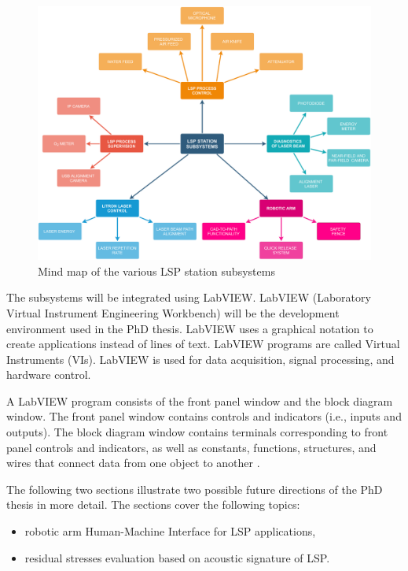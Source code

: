 \begin{figure}[h]
    \centering
    \includegraphics[width=1.0\linewidth]{img/LSP_SUBSYSTEMS.pdf}
    \caption{Mind map of the various LSP station subsystems}
    \label{fig:subsystems}
\end{figure}


The subsystems will be integrated using LabVIEW. LabVIEW (Laboratory Virtual Instrument Engineering Workbench) will be the development environment used in the PhD thesis. LabVIEW uses a graphical notation to create applications instead of lines of text. LabVIEW programs are called Virtual Instruments (VIs). LabVIEW is used for data acquisition, signal processing, and hardware control.

A LabVIEW program consists of the front panel window and the block diagram window. The front panel window contains controls and indicators (i.e., inputs and outputs). The block diagram window contains terminals corresponding to front panel controls and indicators, as well as constants, functions, structures, and wires that connect data from one object to another \cite{bress_2013}.

The following two sections illustrate two possible future directions of the PhD thesis in more detail. The sections cover the following topics:

\begin{itemize}

    \item robotic arm Human-Machine Interface for LSP applications,
    \item residual stresses evaluation based on acoustic signature of LSP.


\end{itemize}


